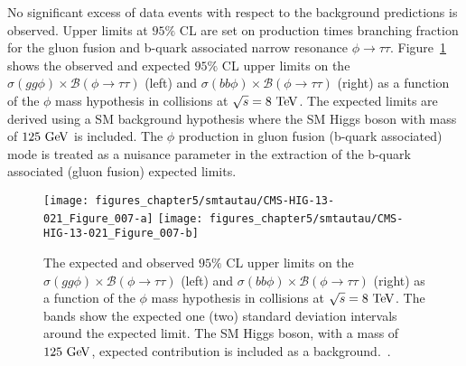 No significant excess of data events with respect to the background predictions is observed. Upper limits at $95\%$ CL are set on production times branching fraction for the gluon fusion and b-quark associated narrow resonance $\phi \rightarrow \tau\tau$. Figure~\ref{fig:mssmtautau} shows  the observed and expected $95\%$ CL upper limits on the $\sigma(gg\phi) \times \mathcal{B}(\phi \rightarrow\tau\tau)$ (left) and $\sigma(bb\phi) \times \mathcal{B}(\phi \rightarrow \tau\tau)$ (right) as a function of the $\phi$ mass hypothesis in collisions at $\sqrt{s}=8~\mathrm{Te\kern -0.1em V}$. The expected limits are derived using a SM background hypothesis where the SM Higgs boson with mass of $125~\mathrm{Ge\kern -0.1em V}$ is included. The $\phi$ production in gluon fusion (b-quark associated) mode is treated as a nuisance parameter in the extraction of the b-quark associated (gluon fusion) expected limits.  
\begin{figure}[htbp]
\centering
\texttt{[image: figures\_chapter5/smtautau/CMS-HIG-13-021\_Figure\_007-a]}
\texttt{[image: figures\_chapter5/smtautau/CMS-HIG-13-021\_Figure\_007-b]}
\caption{The expected and observed $95\%$ CL upper limits on the $\sigma(gg\phi) \times \mathcal{B}(\phi \rightarrow\tau\tau)$ (left) and $\sigma(bb\phi) \times \mathcal{B}(\phi \rightarrow \tau\tau)$ (right) as a function of the $\phi$ mass hypothesis in collisions at $\sqrt{s}=8~\mathrm{Te\kern -0.1em V}$. The bands show the expected one (two) standard deviation intervals around the expected limit. The SM Higgs boson, with a mass of $125~\mathrm{Ge\kern -0.1em V}$, expected contribution is included as a background.~\cite{Khachatryan:2014wca}.}
\label{fig:mssmtautau}
\end{figure}

